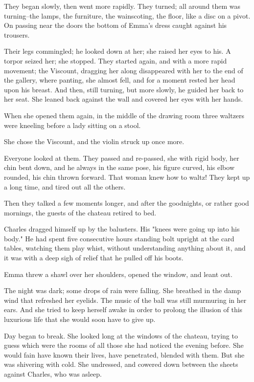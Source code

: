 \documentclass[11pt,twocolumn]{ltugboat}
\begin{document}
They began slowly, then went more rapidly. They turned; all around them
was turning--the lamps, the furniture, the wainscoting, the floor, like
a disc on a pivot. On passing near the doors the bottom of Emma's dress
caught against his trousers.

Their legs commingled; he looked down at her; she raised her eyes to
his. A torpor seized her; she stopped. They started again, and with a
more rapid movement; the Viscount, dragging her along disappeared with
her to the end of the gallery, where panting, she almost fell, and for
a moment rested her head upon his breast. And then, still turning, but
more slowly, he guided her back to her seat. She leaned back against the
wall and covered her eyes with her hands.

When she opened them again, in the middle of the drawing room three
waltzers were kneeling before a lady sitting on a stool.

She chose the Viscount, and the violin struck up once more.

Everyone looked at them. They passed and re-passed, she with rigid body,
her chin bent down, and he always in the same pose, his figure curved,
his elbow rounded, his chin thrown forward. That woman knew how to
waltz! They kept up a long time, and tired out all the others.

Then they talked a few moments longer, and after the goodnights, or
rather good mornings, the guests of the chateau retired to bed.

Charles dragged himself up by the balusters. His "knees were going
up into his body." He had spent five consecutive hours standing
bolt upright at the card tables, watching them play whist, without
understanding anything about it, and it was with a deep sigh of relief
that he pulled off his boots.

Emma threw a shawl over her shoulders, opened the window, and leant out.

The night was dark; some drops of rain were falling. She breathed in the
damp wind that refreshed her eyelids. The music of the ball was still
murmuring in her ears. And she tried to keep herself awake in order to
prolong the illusion of this luxurious life that she would soon have to
give up.

Day began to break. She looked long at the windows of the chateau,
trying to guess which were the rooms of all those she had noticed the
evening before. She would fain have known their lives, have penetrated,
blended with them. But she was shivering with cold. She undressed, and
cowered down between the sheets against Charles, who was asleep.
\end{document}
